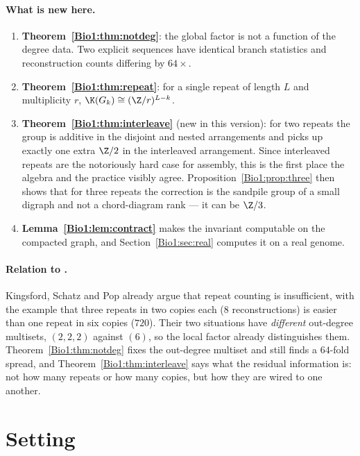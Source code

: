 \paragraph{What is new here.}
\begin{enumerate}
\item[(i)] \textbf{Theorem~\ref{Bio1:thm:notdeg}}: the global factor is not a function of the
degree data. Two explicit sequences have identical branch statistics and reconstruction
counts differing by $64\times$.
\item[(ii)] \textbf{Theorem~\ref{Bio1:thm:repeat}}: for a single repeat of length $L$ and
multiplicity $r$, $\K(G_k)\cong(\Z/r)^{L-k}$.
\item[(iii)] \textbf{Theorem~\ref{Bio1:thm:interleave}} (new in this version): for two repeats
the group is additive in the disjoint and nested arrangements and picks up exactly one
extra $\Z/2$ in the interleaved arrangement. Since interleaved repeats are the notoriously
hard case for assembly, this is the first place the algebra and the practice visibly
agree. Proposition~\ref{Bio1:prop:three} then shows that for three repeats the correction is
the sandpile group of a small digraph and not a chord-diagram rank --- it can be $\Z/3$.
\item[(iv)] \textbf{Lemma~\ref{Bio1:lem:contract}} makes the invariant computable on the
compacted graph, and Section~\ref{Bio1:sec:real} computes it on a real genome.
\end{enumerate}

\paragraph{Relation to \cite{KSP}.}
Kingsford, Schatz and Pop already argue that repeat counting is insufficient, with the
example that three repeats in two copies each ($8$ reconstructions) is easier than one
repeat in six copies ($720$). Their two situations have \emph{different} out-degree
multisets, $(2,2,2)$ against $(6)$, so the local factor already distinguishes them.
Theorem~\ref{Bio1:thm:notdeg} fixes the out-degree multiset and still finds a $64$-fold spread,
and Theorem~\ref{Bio1:thm:interleave} says what the residual information is: not how many
repeats or how many copies, but how they are wired to one another.

\section{Setting}\label{Bio1:sec:setting}

